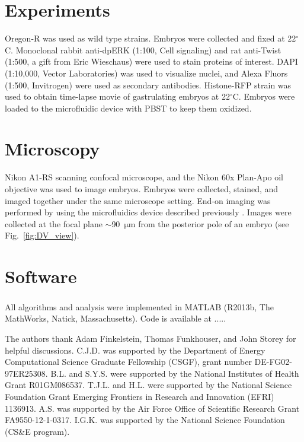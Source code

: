 \documentclass{pnastwo}
\newcommand{\fig}[0]{Fig.}
\begin{document}
\begin{article}




\begin{materials}

\section{Experiments}
%
Oregon-R was used as wild type strains. 
%
Embryos were collected and fixed at 22$^\circ$C. 
%
Monoclonal rabbit anti-dpERK (1:100, Cell signaling) and rat anti-Twist (1:500, a gift from Eric Wieschaus) were used to stain proteins of interest. 
%
DAPI (1:10,000, Vector Laboratories) was used to visualize nuclei, and Alexa Fluors (1:500, Invitrogen) were used as secondary antibodies. 
%
Histone-RFP strain was used to obtain time-lapse movie of gastrulating embryos at 22$^\circ$C. 
%
Embryos were loaded to the microfluidic device with PBST to keep them oxidized. 

\section{Microscopy}
%
Nikon A1-RS scanning confocal microscope, and the Nikon 60x Plan-Apo oil objective was used to image embryos. 
%
Embryos were collected, stained, and imaged together under the same microscope setting. 
%
End-on imaging was performed by using the microfluidics device described previously \cite{chung2010microfluidic}.
%
Images were collected at the focal plane $\sim$90~$\mathrm{\mu m}$ from the posterior pole of an embryo (see \fig~\ref{fig:DV_view}).  

\section{Software}
%
All algorithms and analysis were implemented in MATLAB\textsuperscript{\textregistered} (R2013b, The MathWorks, Natick, Massachusetts).
%
Code is available at .....

\end{materials}




\begin{acknowledgments}
The authors thank Adam Finkelstein,  Thomas Funkhouser, and John Storey for helpful discussions. 
%
C.J.D. was supported by the Department of Energy Computational Science Graduate Fellowship (CSGF), grant number DE-FG02-97ER25308.
%
B.L. and S.Y.S. were supported by the National Institutes of Health Grant R01GM086537. 
%
T.J.L. and H.L. were supported by the National Science Foundation Grant Emerging Frontiers in Research and Innovation (EFRI) 1136913.
%
A.S. was supported by the Air Force Office of Scientific Research Grant
FA9550-12-1-0317.
%
I.G.K. was supported by the National Science Foundation (CS\&E program).
\end{acknowledgments}


\end{article}
\end{document}
